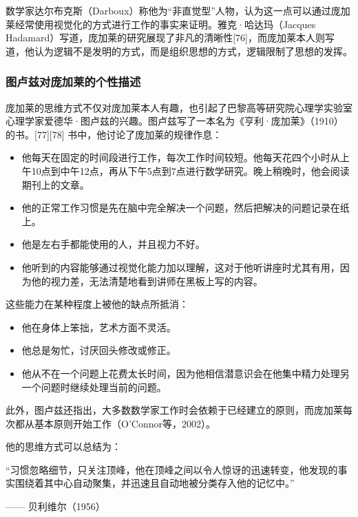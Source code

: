 数学家达尔布克斯（Darboux）称他为“非直觉型”人物，认为这一点可以通过庞加莱经常使用视觉化的方式进行工作的事实来证明。雅克·哈达玛（Jacques Hadamard）写道，庞加莱的研究展现了非凡的清晰性[76]，而庞加莱本人则写道，他认为逻辑不是发明的方式，而是组织思想的方式，逻辑限制了思想的发挥。

\subsubsection{图卢兹对庞加莱的个性描述}  
庞加莱的思维方式不仅对庞加莱本人有趣，也引起了巴黎高等研究院心理学实验室心理学家爱德华·图卢兹的兴趣。图卢兹写了一本名为《亨利·庞加莱》（1910）的书。[77][78] 书中，他讨论了庞加莱的规律作息：

\begin{itemize}
\item 他每天在固定的时间段进行工作，每次工作时间较短。他每天花四个小时从上午10点到中午12点，再从下午5点到7点进行数学研究。晚上稍晚时，他会阅读期刊上的文章。
\item 他的正常工作习惯是先在脑中完全解决一个问题，然后把解决的问题记录在纸上。
\item 他是左右手都能使用的人，并且视力不好。
\item 他听到的内容能够通过视觉化能力加以理解，这对于他听讲座时尤其有用，因为他的视力差，无法清楚地看到讲师在黑板上写的内容。
\end{itemize}
这些能力在某种程度上被他的缺点所抵消：
\begin{itemize}
\item 他在身体上笨拙，艺术方面不灵活。
\item 他总是匆忙，讨厌回头修改或修正。
\item 他从不在一个问题上花费太长时间，因为他相信潜意识会在他集中精力处理另一个问题时继续处理当前的问题。
\end{itemize}
此外，图卢兹还指出，大多数数学家工作时会依赖于已经建立的原则，而庞加莱每次都从基本原则开始工作（O'Connor等，2002）。

他的思维方式可以总结为：

“习惯忽略细节，只关注顶峰，他在顶峰之间以令人惊讶的迅速转变，他发现的事实围绕着其中心自动聚集，并迅速且自动地被分类存入他的记忆中。”

—— 贝利维尔（1956）
